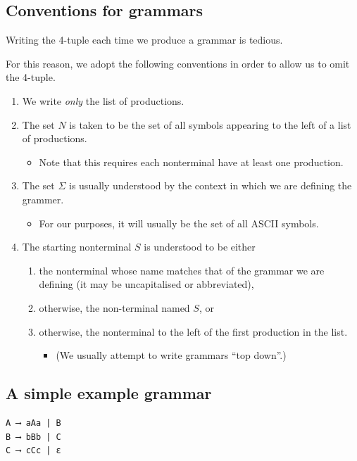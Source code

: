 \documentclass[11pt]{article}
\theoremstyle{definition}
\begin{document}
\subsection{Conventions for grammars}
\label{sec:org053d586}
Writing the 4-tuple each time we produce a grammar is tedious.

For this reason, we adopt the following conventions
in order to allow us to omit the 4-tuple.
\begin{enumerate}
\item We write \emph{only} the list of productions.
\item The set \(N\) is taken to be the set of all symbols
appearing to the left of a list of productions.
\begin{itemize}
\item Note that this requires each nonterminal have
at least one production.
\end{itemize}
\item The set \(Σ\) is usually understood by the context
in which we are defining the grammer.
\begin{itemize}
\item For our purposes, it will usually be the set of
all ASCII symbols.
\end{itemize}
\item The starting nonterminal \(S\) is understood to be either
\begin{enumerate}
\item the nonterminal whose name matches that of the grammar
we are defining (it may be uncapitalised or abbreviated),
\item otherwise, the non-terminal named \(S\), or
\item otherwise, the nonterminal to the left of
the first production in the list.
\begin{itemize}
\item (We usually attempt to write grammars “top down”.)
\end{itemize}
\end{enumerate}
\end{enumerate}

\subsection{A simple example grammar}
\label{sec:org297a234}
\begin{verbatim}
A ⟶ aAa | B
B ⟶ bBb | C
C ⟶ cCc | ε
\end{verbatim}
\end{document}
